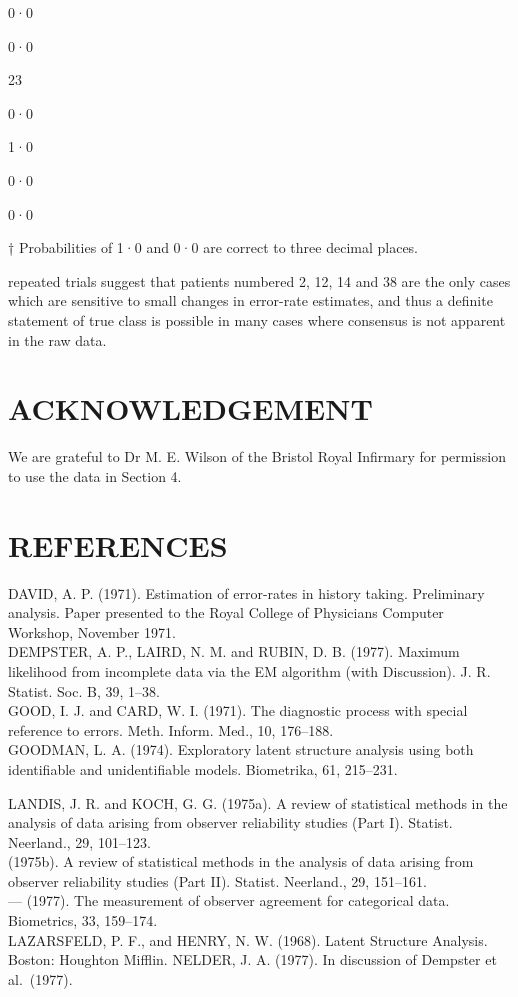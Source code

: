 \documentclass[
]{article}
\begin{document}
0·0

0·0

23

0·0

1·0

0·0

0·0

† Probabilities of 1·0 and 0·0 are correct to three decimal places.

repeated trials suggest that patients numbered 2, 12, 14 and 38 are the
only cases which are sensitive to small changes in error-rate estimates,
and thus a definite statement of true class is possible in many cases
where consensus is not apparent in the raw data.

\section{ACKNOWLEDGEMENT}\label{acknowledgement}

We are grateful to Dr M. E. Wilson of the Bristol Royal Infirmary for
permission to use the data in Section 4.

\section{REFERENCES}\label{references}

DAVID, A. P. (1971). Estimation of error-rates in history taking.
Preliminary analysis. Paper presented to the Royal College of Physicians
Computer Workshop, November 1971.\\
DEMPSTER, A. P., LAIRD, N. M. and RUBIN, D. B. (1977). Maximum
likelihood from incomplete data via the EM algorithm (with Discussion).
J. R. Statist. Soc. B, 39, 1--38.\\
GOOD, I. J. and CARD, W. I. (1971). The diagnostic process with special
reference to errors. Meth. Inform. Med., 10, 176--188.\\
GOODMAN, L. A. (1974). Exploratory latent structure analysis using both
identifiable and unidentifiable models. Biometrika, 61, 215--231.

LANDIS, J. R. and KOCH, G. G. (1975a). A review of statistical methods
in the analysis of data arising from observer reliability studies (Part
I). Statist. Neerland., 29, 101--123.\\
(1975b). A review of statistical methods in the analysis of data arising
from observer reliability studies (Part II). Statist. Neerland., 29,
151--161.\\
--- (1977). The measurement of observer agreement for categorical data.
Biometrics, 33, 159--174.\\
LAZARSFELD, P. F., and HENRY, N. W. (1968). Latent Structure Analysis.
Boston: Houghton Mifflin. NELDER, J. A. (1977). In discussion of
Dempster et al.~(1977).
\end{document}
